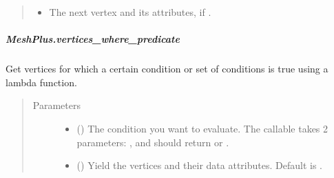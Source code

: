 \documentclass[letterpaper,10pt,english]{sphinxmanual}
\begin{document}
\begin{fulllineitems}
\begin{fulllineitems}
\begin{quote}
\begin{description}
\begin{itemize}
\item {} 
 \textendash{} The next vertex and its attributes, if .

\end{itemize}

\end{description}\end{quote}

\end{fulllineitems}



\subparagraph{MeshPlus.vertices\_where\_predicate}
\label{\detokenize{api/generated/directional_clustering.mesh.MeshPlus.vertices_where_predicate:meshplus-vertices-where-predicate}}\label{\detokenize{api/generated/directional_clustering.mesh.MeshPlus.vertices_where_predicate::doc}}

\begin{fulllineitems}
\label{\detokenize{api/generated/directional_clustering.mesh.MeshPlus.vertices_where_predicate:directional_clustering.mesh.MeshPlus.vertices_where_predicate}}
Get vertices for which a certain condition or set of conditions is true using a lambda function.
\begin{quote}\begin{description}
\item[{Parameters}] \leavevmode\begin{itemize}
\item {} 
 () \textendash{} The condition you want to evaluate. The callable takes 2 parameters: ,  and should return  or .

\item {} 
 () \textendash{} Yield the vertices and their data attributes.
Default is .

\end{itemize}


\end{description}
\end{quote}
\end{fulllineitems}
\end{fulllineitems}
\end{document}
